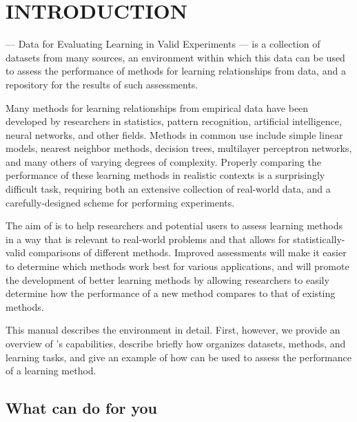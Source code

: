 %
%
\newpage

\section{INTRODUCTION}\label{sec-intro}
\thispagestyle{plain}
\setcounter{figure}{0}

\delve{} --- Data for Evaluating Learning in Valid Experiments --- is
a collection of datasets from many sources, an environment within
which this data can be used to assess the performance of methods for
learning relationships from data, and a repository for the results of
such assessments.

Many methods for learning relationships from empirical data have been
developed by researchers in statistics, pattern recognition,
artificial intelligence, neural networks, and other fields.  Methods
in common use include simple linear models, nearest neighbor methods,
decision trees, multilayer perceptron networks, and many others of
varying degrees of complexity.  Properly comparing the performance of
these learning methods in realistic contexts is a surprisingly
difficult task, requiring both an extensive collection of real-world
data, and a carefully-designed scheme for performing experiments.

The aim of \delve{} is to help researchers and potential users to
assess learning methods in a way that is relevant to real-world
problems and that allows for statistically-valid comparisons of
different methods.  Improved assessments will make it easier to
determine which methods work best for various applications, and will
promote the development of better learning methods by allowing
researchers to easily determine how the performance of a new method
compares to that of existing methods.

This manual describes the \delve{} environment in detail.  First,
however, we provide an overview of \delve's capabilities, describe
briefly how \delve{} organizes datasets, methods, and learning tasks,
and give an example of how \delve{} can be used to assess the
performance of a learning method.


\subsection{What \delve{} can do for you}\label{intro-can-do}

